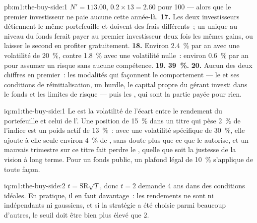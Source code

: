 \begin{solution}{pb:m1:the-buy-side:1}
$N' = 113.00$,  $0.2 \times 13 = 2.60$ pour 100 --- alors que le
premier investisseur ne paie aucune  cette année-là.
\textbf{17.} Les deux investisseurs détiennent le même portefeuille et doivent des
frais différents~; un  unique au niveau du fonds ferait payer au premier investisseur
deux fois les mêmes gains, ou laisser le second en profiter gratuitement.
\textbf{18.} Environ 2.4~\% par an avec une volatilité de 20~\%, contre 1.8~\% avec une
volatilité nulle~: environ 0.6~\% par an pour assumer un risque sans aucune compétence.
\textbf{19.} \textbf{39~\%.}
\textbf{20.} Aucun des deux chiffres en premier~: les modalités qui façonnent le comportement --- le
 et ses conditions de réinitialisation, un hurdle, le capital propre du gérant
investi dans le fonds et les limites de risque --- puis les , qui
sont la partie payée pour rien.
\end{solution}

\begin{solution}{iq:m1:the-buy-side:1}
Le  est la volatilité de l'écart entre le rendement du portefeuille
et celui de l'. Une position de 15~\% dans un titre qui pèse 2~\% de
l'indice est un poids actif de 13~\%~: avec une volatilité spécifique de 30~\%, elle ajoute à elle seule
environ 4~\% de , sans doute plus que ce que le  autorise, et un
mauvais trimestre sur ce titre fait perdre le , quelle que soit la justesse
de la vision à long terme. Pour un fonds public, un plafond légal de 10~\% s'applique de toute façon.
\end{solution}

\begin{solution}{iq:m1:the-buy-side:2}
$t = \mathrm{SR}\sqrt{T}$, donc $t = 2$ demande 4 ans dans des
conditions idéales. En pratique, il en faut davantage~: les rendements ne sont ni indépendants ni gaussiens, et si
la stratégie a été choisie parmi beaucoup d'autres, le seuil doit être bien plus élevé que 2.
\end{solution}

